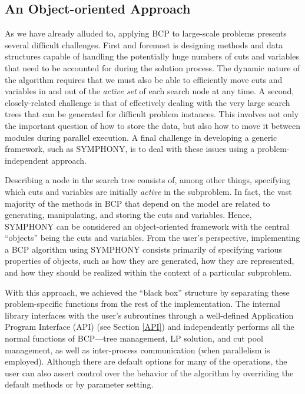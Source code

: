 \subsection{An Object-oriented Approach}

As we have already alluded to, applying BCP to large-scale problems
presents several difficult challenges. First and foremost is designing
methods and data structures capable of handling the potentially huge
numbers of cuts and variables that need to be accounted for during the
solution process. The dynamic nature of the algorithm requires that we
must also be able to efficiently move cuts and variables in and out of
the {\em active set} of each search node at any time. A second,
closely-related challenge is that of effectively dealing with the very
large search trees that can be generated for difficult problem
instances. This involves not only the important question of how to
store the data, but also how to move it between modules during
parallel execution. A final challenge in developing a generic
framework, such as SYMPHONY, is to deal with these issues using a
problem-independent approach.

Describing a node in the search tree consists of, among other things,
specifying which cuts and variables are initially {\em active} in the
subproblem. In fact, the vast majority of the methods in BCP that
depend on the model are related to generating, manipulating, and
storing the cuts and variables. Hence, SYMPHONY can be considered an
object-oriented framework with the central ``objects'' being the cuts
and variables. From the user's perspective, implementing a BCP
algorithm using SYMPHONY consists primarily of specifying various
properties of objects, such as how they are generated, how they are
represented, and how they should be realized within the context of a
particular subproblem.

With this approach, we achieved the ``black box'' structure by
separating these problem-specific functions from the rest of the
implementation. The internal library interfaces with the user's
subroutines through a well-defined Application Program Interface (API) (see
Section \ref{API})
and independently performs all the normal functions of BCP---tree
management, LP solution, and cut pool management, as well as inter-process
communication (when parallelism is employed). Although there are
default options for many of the operations, the user can also assert
control over the behavior of the algorithm by overriding the default
methods or by parameter setting.

